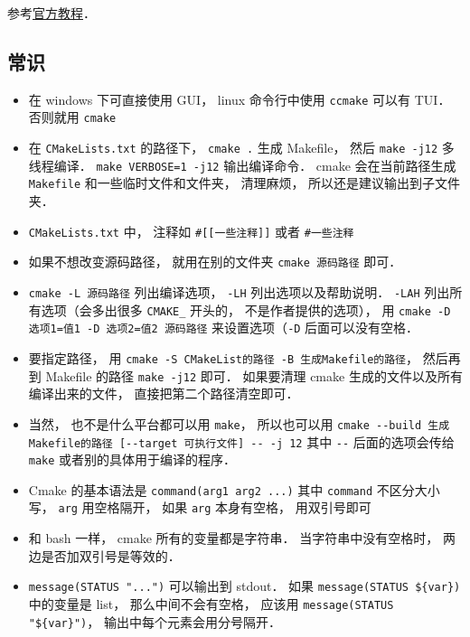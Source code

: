 
\begin{issues}
\issueDraft
\end{issues}


参考\href{https://cmake.org/cmake/help/latest/guide/tutorial/index.html}{官方教程}．

\subsection{常识}
\begin{itemize}
\item 在 windows 下可直接使用 GUI， linux 命令行中使用 \verb`ccmake` 可以有 TUI． 否则就用 \verb`cmake`
\item 在 \verb|CMakeLists.txt| 的路径下， \verb`cmake .` 生成 Makefile， 然后 \verb|make -j12| 多线程编译． \verb|make VERBOSE=1 -j12| 输出编译命令． cmake 会在当前路径生成 \verb|Makefile| 和一些临时文件和文件夹， 清理麻烦， 所以还是建议输出到子文件夹．
\item \verb|CMakeLists.txt| 中， 注释如 \verb|#[[一些注释]]| 或者 \verb|#一些注释|
\item 如果不想改变源码路径， 就用在别的文件夹 \verb|cmake 源码路径| 即可．
\item \verb|cmake -L 源码路径| 列出编译选项， \verb|-LH| 列出选项以及帮助说明． \verb|-LAH| 列出所有选项（会多出很多 \verb|CMAKE_| 开头的， 不是作者提供的选项）， 用 \verb|cmake -D 选项1=值1 -D 选项2=值2 源码路径| 来设置选项（\verb|-D| 后面可以没有空格．
\item 要指定路径， 用 \verb|cmake -S CMakeList的路径 -B 生成Makefile的路径|， 然后再到 Makefile 的路径 \verb|make -j12| 即可． 如果要清理 cmake 生成的文件以及所有编译出来的文件， 直接把第二个路径清空即可．
\item 当然， 也不是什么平台都可以用 \verb|make|， 所以也可以用 \verb|cmake --build 生成Makefile的路径 [--target 可执行文件] -- -j 12| 其中 \verb|--| 后面的选项会传给 \verb|make| 或者别的具体用于编译的程序．
\item Cmake 的基本语法是 \verb`command(arg1 arg2 ...)` 其中 \verb|command| 不区分大小写， \verb`arg` 用空格隔开， 如果 \verb|arg| 本身有空格， 用双引号即可
\item 和 bash 一样， cmake 所有的变量都是字符串． 当字符串中没有空格时， 两边是否加双引号是等效的．
\item \verb`message(STATUS "...")` 可以输出到 stdout． 如果 \verb`message(STATUS ${var})` 中的变量是 list， 那么中间不会有空格， 应该用 \verb`message(STATUS "${var}")`， 输出中每个元素会用分号隔开．

\end{itemize}
